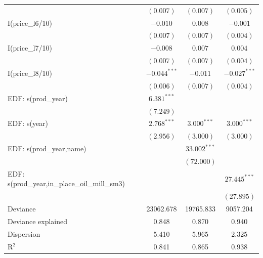 \documentclass[11pt]{article}
\begin{document}
\begin{table}
\begin{center}
\begin{tabular}{l c c c }
                                             & $(0.007)$      & $(0.007)$      & $(0.005)$        \\
I(price\_l6/10)                              & $-0.010$       & $0.008$        & $-0.001$         \\
                                             & $(0.007)$      & $(0.007)$      & $(0.004)$        \\
I(price\_l7/10)                              & $-0.008$       & $0.007$        & $0.004$          \\
                                             & $(0.007)$      & $(0.007)$      & $(0.004)$        \\
I(price\_l8/10)                              & $-0.044^{***}$ & $-0.011$       & $-0.027^{***}$   \\
                                             & $(0.006)$      & $(0.007)$      & $(0.004)$        \\
EDF: s(prod\_year)                           & $6.381^{***}$  &                &                  \\
                                             & $(7.249)$      &                &                  \\
EDF: s(year)                                 & $2.768^{***}$  & $3.000^{***}$  & $3.000^{***}$    \\
                                             & $(2.956)$      & $(3.000)$      & $(3.000)$        \\
EDF: s(prod\_year,name)                      &                & $33.002^{***}$ &                  \\
                                             &                & $(72.000)$     &                  \\
EDF: s(prod\_year,in\_place\_oil\_mill\_sm3) &                &                & $27.445^{***}$   \\
                                             &                &                & $(27.895)$       \\
\hline
Deviance                                     & 23062.678      & 19765.833      & 9057.204         \\
Deviance explained                           & 0.848          & 0.870          & 0.940            \\
Dispersion                                   & 5.410          & 5.965          & 2.325            \\
R$^2$                                        & 0.841          & 0.865          & 0.938            \\

\end{tabular}
\end{center}
\end{table}
\end{document}
